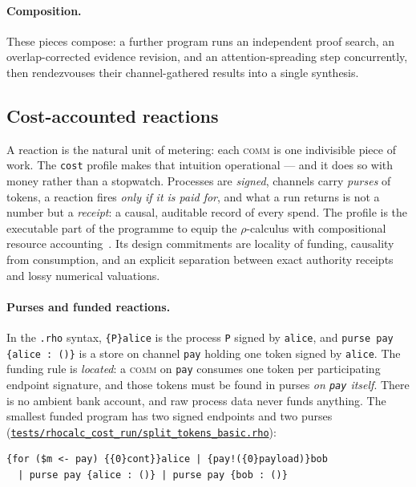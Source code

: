 \documentclass[11pt]{article}
\newcommand{\code}[1]{\texttt{#1}}
\begin{document}
\paragraph{Composition.} These pieces compose: a further program runs an independent proof
search, an overlap-corrected evidence revision, and an attention-spreading step concurrently,
then rendezvouses their channel-gathered results into a single synthesis.

\subsection{Cost-accounted reactions}
\label{sec:rho-cost}

A reaction is the natural unit of metering: each \textsc{comm} is one indivisible piece of
work. The \code{cost} profile makes that intuition operational --- and it does so with money
rather than a stopwatch. Processes are \emph{signed}, channels carry \emph{purses} of
tokens, a reaction fires \emph{only if it is paid for}, and what a run returns is not a
number but a \emph{receipt}: a causal, auditable record of every spend. The profile is the
executable part of the programme to equip the $\rho$-calculus with compositional resource
accounting~\cite{costendofunctor,rhocost-companion}. Its design commitments are locality of
funding, causality from consumption, and an explicit separation between exact authority
receipts and lossy numerical valuations.

\paragraph{Purses and funded reactions.} In the \code{.rho} syntax, \code{\{P\}alice} is
the process \code{P} signed by \code{alice}, and \code{purse pay \{alice : ()\}} is a store
on channel \code{pay} holding one token signed by \code{alice}. The funding rule is
\emph{located}: a \textsc{comm} on \code{pay} consumes one token per participating endpoint
signature, and those tokens must be found in purses \emph{on \code{pay} itself}. There is no
ambient bank account, and raw process data never funds anything. The smallest funded program
has two signed endpoints and two purses
(\href{https://github.com/zariuq/CeTTa/blob/e23de3043462d80e27f9c9009bd0f1b955ed140c/tests/rhocalc_cost_run/split_tokens_basic.rho}{\code{tests/rhocalc\_cost\_run/split\_tokens\_basic.rho}}):

\begin{lstlisting}
{for ($m <- pay) {{0}cont}}alice | {pay!({0}payload)}bob
  | purse pay {alice : ()} | purse pay {bob : ()}
\end{lstlisting}
\end{document}
